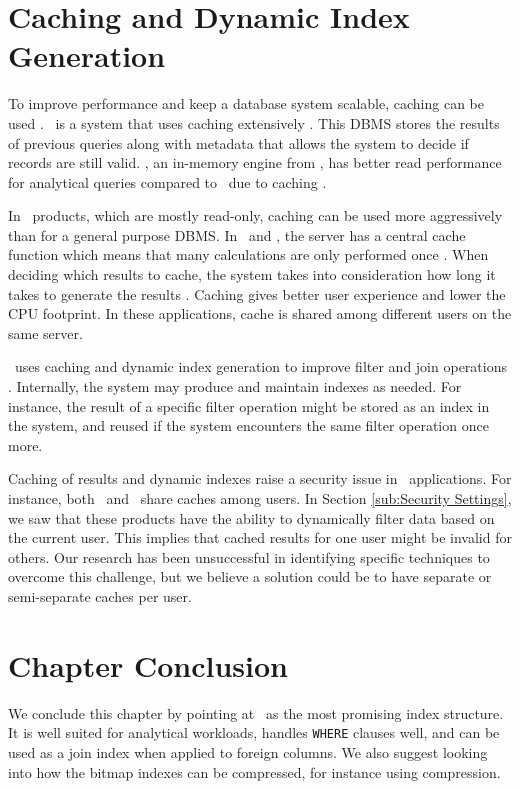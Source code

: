 \section{Caching and Dynamic Index Generation}
\label{sec:Caching and Dynamic Index Generation}
To improve performance and keep a database system scalable, caching can be used \cite{Plattner2014-fr}. \exasol~is a system that uses caching extensively \cite{Exasol2014-xh}. This DBMS stores the results of previous queries along with metadata that allows the system to decide if records are still valid. , an in-memory engine from , has better read performance for analytical queries compared to \mssql~due to caching \cite{Ferrari2012-hm}.

In \bd~products, which are mostly read-only, caching can be used more aggressively than for a general purpose DBMS. In \qlikview~and \tableau, the server has a central cache function which means that many calculations are only performed once \cite{Kamkolkar2015-iq, Qlik2011-ef}. When deciding which results to cache, the system takes into consideration how long it takes to generate the results \cite{noauthor_undated-js}. Caching gives better user experience and lower the CPU footprint. In these applications, cache is shared among different users on the same server.

\exasol~uses caching and dynamic index generation to improve filter and join operations \cite{Exasol2014-xh}. Internally, the system may produce and maintain indexes as needed. For instance, the result of a specific filter operation might be stored as an index in the system, and reused if the system encounters the same filter operation once more.

Caching of results and dynamic indexes raise a security issue in \bd~applications. For instance, both \qlikview~and \tableau~share caches among users. In Section \ref{sub:Security Settings}, we saw that these products have the ability to dynamically filter data based on the current user. This implies that cached results for one user might be invalid for others. Our research has been unsuccessful in identifying specific techniques to overcome this challenge, but we believe a solution could be to have separate or semi-separate caches per user.

\section{Chapter Conclusion}
\label{sec:Chapter Conclusion}
We conclude this chapter by pointing at \biti~as the most promising index structure. It is well suited for analytical workloads, handles \texttt{WHERE} clauses well, and can be used as a join index when applied to foreign columns. We also suggest looking into how the bitmap indexes can be compressed, for instance using  compression.

